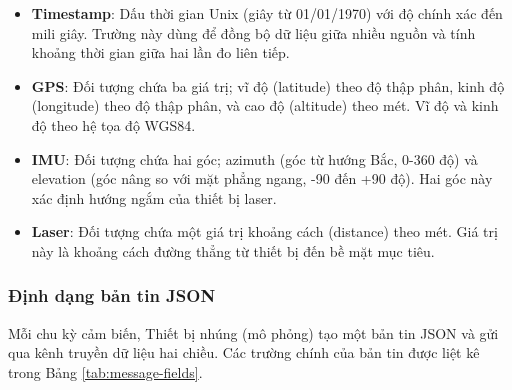 \begin{itemize}
    \item \textbf{Timestamp}: Dấu thời gian Unix (giây từ 01/01/1970) với độ chính xác đến mili giây. Trường này dùng để đồng bộ dữ liệu giữa nhiều nguồn và tính khoảng thời gian giữa hai lần đo liên tiếp.
    \item \textbf{GPS}: Đối tượng chứa ba giá trị; vĩ độ (latitude) theo độ thập phân, kinh độ (longitude) theo độ thập phân, và cao độ (altitude) theo mét. Vĩ độ và kinh độ theo hệ tọa độ WGS84.
    \item \textbf{IMU}: Đối tượng chứa hai góc; azimuth (góc từ hướng Bắc, 0-360 độ) và elevation (góc nâng so với mặt phẳng ngang, -90 đến +90 độ). Hai góc này xác định hướng ngắm của thiết bị laser.
    \item \textbf{Laser}: Đối tượng chứa một giá trị khoảng cách (distance) theo mét. Giá trị này là khoảng cách đường thẳng từ thiết bị đến bề mặt mục tiêu.
\end{itemize}

\subsubsection{Định dạng bản tin JSON}

\hspace{0.5cm} Mỗi chu kỳ cảm biến, Thiết bị nhúng (mô phỏng) tạo một bản tin JSON và gửi qua kênh truyền dữ liệu hai chiều. Các trường chính của bản tin được liệt kê trong Bảng \ref{tab:message-fields}.

\begin{table}[H]
\centering
\caption{Các trường trong bản tin JSON}
\label{tab:message-fields}
\end{table}

